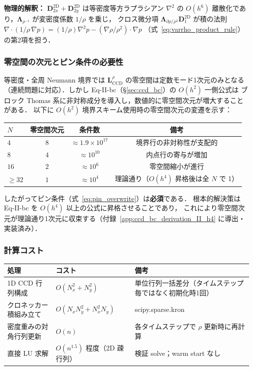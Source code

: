\textbf{物理的解釈：}
$\mathbf{D}_{2x}^{\mathrm{2D}} + \mathbf{D}_{2y}^{\mathrm{2D}}$ は等密度等方ラプラシアン $\nabla^2$
の $O(h^6)$ 離散化であり，$\boldsymbol{\Lambda}_{\rho^{-1}}$ が変密度係数 $1/\rho$ を乗じ，
クロス微分項 $\boldsymbol{\Lambda}_{\partial\rho/\rho^2}\mathbf{D}_1^{\mathrm{2D}}$ が積の法則
$\nabla\cdot(1/\rho\,\nabla p) = (1/\rho)\nabla^2 p - (\nabla\rho/\rho^2)\cdot\nabla p$
（式~\eqref{eq:varrho_product_rule}）の第2項を担う．

\subsubsection{零空間の次元とピン条件の必要性}

等密度・全周 Neumann 境界では $\mathbf{L}_{\mathrm{CCD}}^{\rho}$ の零空間は定数モード1次元のみとなる
（連続問題に対応）．しかし Eq-II-bc（§\ref{sec:ccd_bc}）の $O(h^2)$ 一側公式は
ブロック Thomas 系に非対称成分を導入し，数値的に零空間次元が増大することがある．
以下に $O(h^2)$ 境界スキーム使用時の零空間次元の変遷を示す：
\begin{center}
\PaperTableSetup
\begin{tabular}{lccc}
\hline
$N$ & 零空間次元 & 条件数 & 備考 \\
\hline
$4$  & $8$ & $\approx 1.9 \times 10^{17}$ & 境界行の非対称性が支配的 \\
$8$  & $4$ & $\approx 10^{10}$ & 内点行の寄与が増加 \\
$16$ & $2$ & $\approx 10^{6}$ & 零空間縮小が進行 \\
$\ge 32$ & $1$ & $\approx 10^{4}$ & 理論通り（$O(h^4)$ 昇格後は全 $N$ で 1） \\
\hline
\end{tabular}
\end{center}

したがってピン条件（式~\eqref{eq:pin_overwrite}）は\textbf{必須}である．
根本的解決策は Eq-II-bc を $O(h^4)$ 以上の公式に昇格させることであり，
これにより零空間次元が理論通り1次元に収束する（付録~\ref{app:ccd_bc_derivation_II_h4} に導出・実装済み）．

\subsubsection{計算コスト}

\begin{center}
\PaperTableSetup
\begin{tabular}{llp{5.5cm}}
\hline
処理 & コスト & 備考 \\
\hline
1D CCD 行列構成 & $O(N_x^2 + N_y^2)$ & 単位行列一括差分（タイムステップ毎ではなく初期化時1回） \\
クロネッカー積組み立て & $O(N_x N_y^2 + N_x^2 N_y)$ & scipy.sparse.kron \\
密度重みの対角行列更新 & $O(n)$ & 各タイムステップで $\rho$ 更新時に再計算 \\
直接 LU 求解 & $O(n^{1.5})$ 程度（2D 疎行列） & 検証 solve；warm start なし \\
\hline
\end{tabular}
\end{center}

